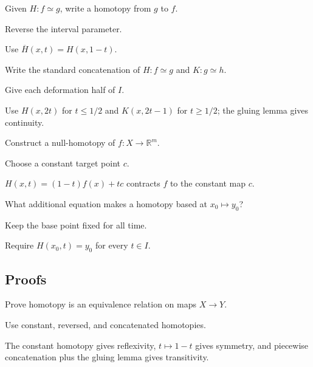 \begin{exercise}\label{exr:viii01-ped-02}
Given $H:f\simeq g$, write a homotopy from $g$ to $f$.
\end{exercise}
\begin{hint}
Reverse the interval parameter.
\end{hint}
\begin{solution}
Use $\overline H(x,t)=H(x,1-t)$.
\end{solution}

\begin{exercise}\label{exr:viii01-ped-03}
Write the standard concatenation of $H:f\simeq g$ and $K:g\simeq h$.
\end{exercise}
\begin{hint}
Give each deformation half of $I$.
\end{hint}
\begin{solution}
Use $H(x,2t)$ for $t\le1/2$ and $K(x,2t-1)$ for $t\ge1/2$; the gluing lemma gives continuity.
\end{solution}

\begin{exercise}\label{exr:viii01-ped-04}
Construct a null-homotopy of $f:X\to\mathbb R^m$.
\end{exercise}
\begin{hint}
Choose a constant target point $c$.
\end{hint}
\begin{solution}
$H(x,t)=(1-t)f(x)+tc$ contracts $f$ to the constant map $c$.
\end{solution}

\begin{exercise}\label{exr:viii01-ped-05}
What additional equation makes a homotopy based at $x_0\mapsto y_0$?
\end{exercise}
\begin{hint}
Keep the base point fixed for all time.
\end{hint}
\begin{solution}
Require $H(x_0,t)=y_0$ for every $t\in I$.
\end{solution}

\subsection*{Proofs}

\begin{exercise}\label{exr:viii01-ped-06}
Prove homotopy is an equivalence relation on maps $X\to Y$.
\end{exercise}
\begin{hint}
Use constant, reversed, and concatenated homotopies.
\end{hint}
\begin{solution}
The constant homotopy gives reflexivity, $t\mapsto1-t$ gives symmetry, and piecewise concatenation plus the gluing lemma gives transitivity.
\end{solution}

